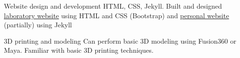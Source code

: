 

\begin{cvskills}

  \cvskill
    {Website design and development} 
    {HTML, CSS, Jekyll. Built and designed \href{http://www.protein.osaka-u.ac.jp/cell_systems}{laboratory website} using HTML and CSS (Bootstrap) and \href{https://www.jnicolaus.com}{personal website} (partially) using Jekyll} 
    
  \cvskill
    {3D printing and modeling} %
    {Can perform basic 3D modeling using Fusion360 or Maya. Familiar with basic 3D printing techniques.} %

\end{cvskills}
